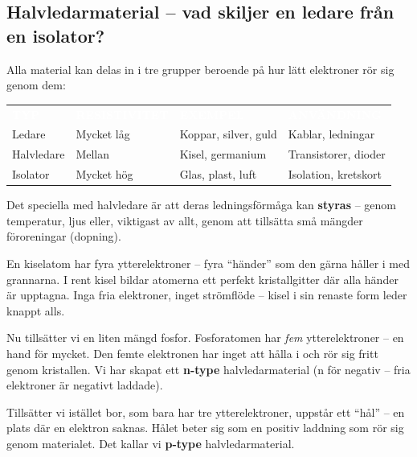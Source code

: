 \documentclass[a4paper,11pt,twoside]{book}
\newcommand{\emoji}[1]{{\emojifont #1}}
\newcommand{\tblhdr}[1]{\cellcolor{greydark}\textcolor{white}{\headingfont\bfseries\footnotesize\MakeUppercase{#1}}}
\begin{document}
\subsection{Halvledarmaterial -- vad skiljer en ledare från en isolator?}

Alla material kan delas in i tre grupper beroende på hur lätt
elektroner rör sig genom dem:

\begin{bluebox}[title={\emoji{🔑} Ledare, halvledare och isolatorer}]
\begin{center}
\begin{tabular}{llll}
\rowcolor{greydark}
\tblhdr{Typ} & \tblhdr{Resistivitet} & \tblhdr{Exempel} & \tblhdr{Användning} \\
Ledare & Mycket låg & Koppar, silver, guld & Kablar, ledningar \\
\rowcolor{greylight}
Halvledare & Mellan & Kisel, germanium & Transistorer, dioder \\
Isolator & Mycket hög & Glas, plast, luft & Isolation, kretskort \\
\end{tabular}
\end{center}

\smallskip
Det speciella med halvledare är att deras ledningsförmåga kan
\textbf{styras} -- genom temperatur, ljus eller, viktigast av
allt, genom att tillsätta små mängder föroreningar (dopning).
\end{bluebox}

\begin{storybox}[{\emoji{💡} Kiselatomens fyra händer}]
En kiselatom har fyra ytterelektroner -- fyra ``händer'' som den
gärna håller i med grannarna. I rent kisel bildar atomerna ett
perfekt kristallgitter där alla händer är upptagna. Inga fria
elektroner, inget strömflöde -- kisel i sin renaste form leder
knappt alls.

Nu tillsätter vi en liten mängd fosfor. Fosforatomen har
\emph{fem} ytterelektroner -- en hand för mycket. Den femte
elektronen har inget att hålla i och rör sig fritt genom
kristallen. Vi har skapat ett \textbf{n-type} halvledarmaterial
(n för negativ -- fria elektroner är negativt laddade).

Tillsätter vi istället bor, som bara har tre ytterelektroner,
uppstår ett ``hål'' -- en plats där en elektron saknas. Hålet
beter sig som en positiv laddning som rör sig genom materialet.
Det kallar vi \textbf{p-type} halvledarmaterial.
\end{storybox}
\end{document}
